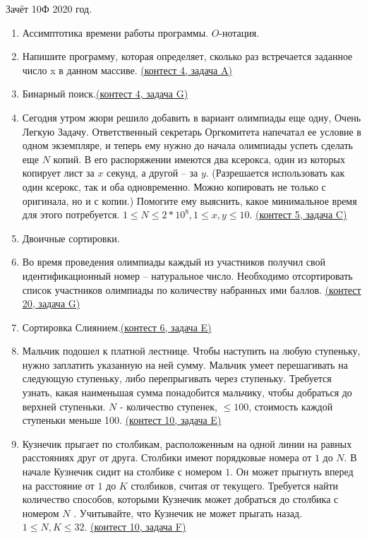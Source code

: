 \documentclass[a4paper,12pt]{article}
\begin{document}
Зачёт 10Ф 2020 год.
\begin{enumerate}
\item Ассимптотика времени работы программы. $O$-нотация.
\item Напишите программу, которая определяет, сколько раз встречается заданное число x в данном массиве. \href{https://informatics.msk.ru/mod/statements/view3.php?chapterid=223}{(контест 4, задача A)}
\item Бинарный поиск.\href{https://informatics.msk.ru/mod/statements/view3.php?chapterid=2}{(контест 4, задача G)}
\item Сегодня утром жюри решило добавить в вариант олимпиады еще одну, Очень Легкую Задачу. Ответственный секретарь Оргкомитета напечатал ее условие в одном экземпляре, и теперь ему нужно до начала олимпиады успеть сделать еще $N$ копий. В его распоряжении имеются два ксерокса, один из которых копирует лист за $x$ секунд, а другой – за $y$. (Разрешается использовать как один ксерокс, так и оба одновременно. Можно копировать не только с оригинала, но и с копии.) Помогите ему выяснить, какое минимальное время для этого потребуется. $1\le N\le 2*10^8, 1\le x, y \le 10$. \href{https://informatics.msk.ru/mod/statements/view3.php?chapterid=490}{(контест 5, задача C)}
\item Двоичные сортировки.
\item Во время проведения олимпиады каждый из участников получил свой идентификационный номер – натуральное число. Необходимо отсортировать список участников олимпиады по количеству набранных ими баллов. \href{https://informatics.msk.ru/mod/statements/view3.php?chapterid=1446}{(контест 20, задача G)}
\item Сортировка Слиянием.\href{https://informatics.msk.ru/mod/statements/view3.php?chapterid=766}{(контест 6, задача E)}
\item Мальчик подошел к платной лестнице. Чтобы наступить на любую ступеньку, нужно заплатить указанную на ней сумму. Мальчик умеет перешагивать на следующую ступеньку, либо перепрыгивать через ступеньку. Требуется узнать, какая наименьшая сумма понадобится мальчику, чтобы добраться до верхней ступеньки. $N$ - количество ступенек, $\le 100$, стоимость каждой ступеньки меньше 100. \href{https://informatics.msk.ru/mod/statements/view3.php?chapterid=915}{(контест 10, задача E)}
\item Кузнечик прыгает по столбикам, расположенным на одной линии на равных расстояниях друг от друга. Столбики имеют порядковые номера от $1$ до $N$. В начале Кузнечик сидит на столбике с номером $1$. Он может прыгнуть вперед на расстояние от $1$ до $K$ столбиков, считая от текущего. Требуется найти количество способов, которыми Кузнечик может добраться до столбика с номером $N$ . Учитывайте, что Кузнечик не может прыгать назад. $1 \le N, K \le 32$. \href{https://informatics.msk.ru/mod/statements/view3.php?chapterid=112603}{(контест 10, задача F)}

\end{enumerate}
\end{document}
